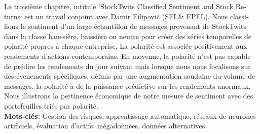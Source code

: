 \begin{otherlanguage}{french}
Le troisième chapitre, intitulé `StockTwits Classified Sentiment and Stock Returns` est un travail conjoint avec Damir Filipović (SFI \& EPFL). Nous classifions le sentiment d'un large échantillon de messages provenant de StockTwits dans la classe haussière, baissière ou neutre pour créer des séries temporelles de polarité propres à chaque entreprise. La polarité est associée positivement aux rendements d'actions contemporains. En moyenne, la polarité n'est pas capable de prédire les rendements du jour suivant mais lorsque nous nous focalisons sur des évenements spécifiques, définis par une augmentation soudaine du volume de messages, la polarité a de la puissance prédictive sur les rendements anormaux. Nous illustrons la pertinence économique de notre mesure de sentiment avec des portefeuilles triés par polarité.\\

\textbf{Mots-clés:} Gestion des risques, apprentissage automatique, réseaux de neurones artificiels, évaluation d'actifs, mégadonnées, données alternatives.

\end{otherlanguage}



